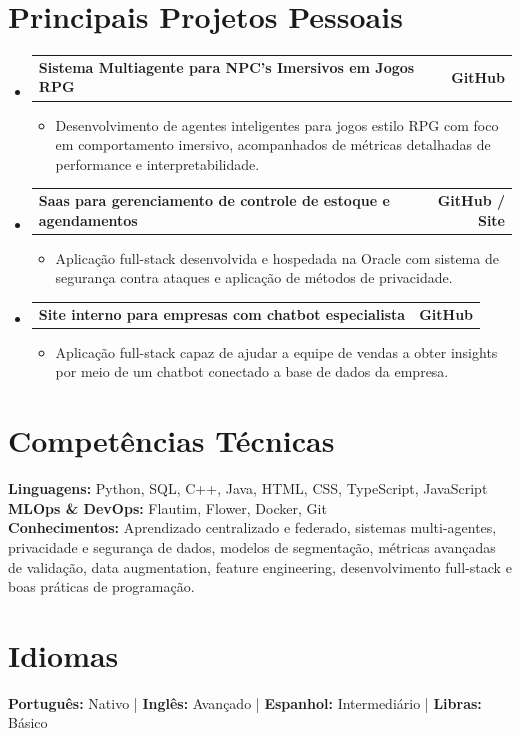 \documentclass[11pt]{article}
\makeatletter
\newcommand{\resumeItem}[1]{
  \item\small{
    {#1 \vspace{-2pt}}
  }
}
\newcommand{\resumeProjectHeading}[2]{
    \item
    \begin{tabular*}{1.0\textwidth}{l@{\extracolsep{\fill}}r}
      \small#1 & \textbf{\small #2} \\
    \end{tabular*}\vspace{-7pt}
}
\newcommand{\resumeSubHeadingListStart}{\begin{itemize}[leftmargin=0.0in, label={}]}
\newcommand{\resumeSubHeadingListEnd}{\end{itemize}}
\newcommand{\resumeItemListStart}{\begin{itemize}[leftmargin=0.15in]}
\newcommand{\resumeItemListEnd}{\end{itemize}\vspace{-5pt}}
\makeatother
\begin{document}
\section{Principais Projetos Pessoais}
    \resumeSubHeadingListStart
      \resumeProjectHeading
        {\textbf{Sistema Multiagente para NPC's Imersivos em Jogos RPG}}{GitHub}
        \resumeItemListStart
          \resumeItem{Desenvolvimento de agentes inteligentes para jogos estilo RPG com foco em comportamento imersivo, acompanhados de métricas detalhadas de performance e interpretabilidade.}
        \resumeItemListEnd
      \resumeProjectHeading
        {\textbf{Saas para gerenciamento de controle de estoque e agendamentos}}{GitHub / Site}
        \resumeItemListStart
          \resumeItem{Aplicação full-stack desenvolvida e hospedada na Oracle com sistema de segurança contra ataques e aplicação de métodos de privacidade.}
        \resumeItemListEnd
      \resumeProjectHeading
        {\textbf{Site interno para empresas com chatbot especialista}}{GitHub}
        \resumeItemListStart
          \resumeItem{Aplicação full-stack capaz de ajudar a equipe de vendas a obter insights por meio de um chatbot conectado a base de dados da empresa.}
        \resumeItemListEnd
    \resumeSubHeadingListEnd

\section{Competências Técnicas}
 \begin{itemize}[leftmargin=0.15in, label={}]
    \small{\item{
     \textbf{Linguagens:}{ Python, SQL, C++, Java, HTML, CSS, TypeScript, JavaScript} \\
     \textbf{MLOps \& DevOps:}{ Flautim, Flower, Docker, Git} \\
     \textbf{Conhecimentos:}{ Aprendizado centralizado e federado, sistemas multi-agentes, privacidade e segurança de dados, modelos de segmentação, métricas avançadas de validação, data augmentation, feature engineering, desenvolvimento full-stack e boas práticas de programação.}
    }}
 \end{itemize}

\section{Idiomas}
 \begin{itemize}[leftmargin=0.15in, label={}]
    \small{\item{
     \textbf{Português:} Nativo \quad | \quad
     \textbf{Inglês:} Avançado \quad | \quad
     \textbf{Espanhol:} Intermediário \quad | \quad
     \textbf{Libras:} Básico
    }}
 \end{itemize}
\end{document}
